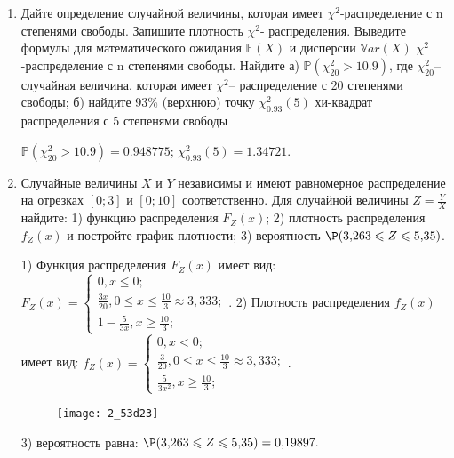 \documentclass[a4paper,12pt]{article}
\begin{document}
\begin{enumerate}


\item


Дайте определение случайной величины, которая имеет $\chi ^{2}$-распределение с n степенями свободы.
Запишите плотность $\chi ^{2}$- распределения. Выведите формулы для математического ожидания $\mathbb{E}(X)$ и дисперсии $\mathbb{V}ar(X)$ $\chi ^{2}$-распределение с n степенями свободы. Найдите а) $\mathbb{P}(\chi _{20}^{2} > 10.9)$, где $\chi _{20}^{2}$–случайная величина, которая имеет $\chi ^{2}$– распределение с 20 степенями свободы; б) найдите 93\%
(верхнюю) точку $\chi _{0.93}^{2} (5)$ хи-квадрат распределения с 5 степенями свободы




$\mathbb{P}(\chi _{20}^{2} > 10.9) =  0.948775$; $\chi _{0.93}^{2} (5) = 1.34721$.


\item



Случайные величины $X$ и $Y$ независимы и имеют равномерное
распределение на отрезках $[0;3]$ и $[0;10]$ соответственно. Для случайной величины $Z=\frac{Y}{X}$ найдите: 
1) функцию распределения $F_Z(x)$;
2) плотность распределения $f_Z(x)$ и постройте график плотности;
3) вероятность $\P(3,\!263\leqslant Z\leqslant 5,\!35)$.




1) Функция распределения $F_Z(x)$ имеет вид:
$
F_Z(x)=\left\{
\begin{array}{l}
0, x\leqslant 0;\\
\frac{3 x}{20}, 0\leqslant x\leqslant \frac{10}{3}\approx 3,\!333;\\
1 - \frac{5}{3 x}, x\geqslant\frac{10}{3};
\end{array}.
\right.
$
2) Плотность распределения $f_Z(x)$ имеет вид:
$
f_Z(x)=\left\{
\begin{array}{l}
0, x<0;\\
\frac{3}{20}, 0\leqslant x\leqslant \frac{10}{3}\approx 3,\!333;\\
\frac{5}{3 x^{2}}, x\geqslant\frac{10}{3};
\end{array}.
\right.
$


\begin{figure}[H]
    \texttt{[image: 2\_53d23]}
\end{figure}


3) вероятность равна:
$
\P(3,\!263\leqslant Z\leqslant 5,\!35)=
0,\!19897.
$



\end{enumerate}
\end{document}
